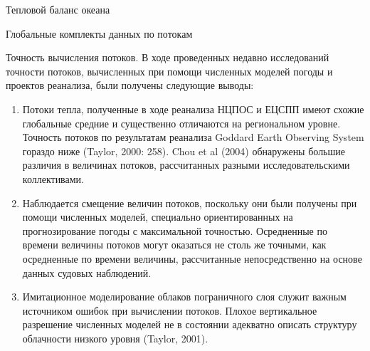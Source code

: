 \begin{chapter}{Тепловой баланс океана}
\begin{section}{Глобальные комплекты данных по потокам}
\begin{paragraph}{Точность вычисления потоков.}
В ходе проведенных недавно исследований точности потоков, вычисленных при
помощи численных моделей погоды и проектов реанализа, были получены следующие
выводы:
%
\begin{enumerate}
\item
Потоки тепла, полученные в ходе реанализа НЦПОС и ЕЦСПП имеют схожие глобальные
средние и существенно отличаются на региональном уровне. Точность потоков по
результатам реанализа Goddard Earth Observing System гораздо 
ниже (Taylor, 2000: 258). Chou et al (2004) обнаружены большие различия в
величинах потоков, рассчитанных разными исследовательскими коллективами.
%

\item
Наблюдается смещение величин потоков, поскольку они были получены при помощи
численных моделей, специально ориентированных на прогнозирование погоды
с максимальной точностью. Осредненные по времени величины потоков могут 
оказаться не столь же точными, как осредненные по времени величины, 
рассчитанные непосредственно на основе данных судовых наблюдений.
%

\item
Имитационное моделирование облаков пограничного слоя служит важным источником
ошибок при вычислении потоков. Плохое вертикальное разрешение численных моделей
не в состоянии адекватно описать структуру облачности низкого уровня (Taylor, 2001).
%


\end{enumerate}
\end{paragraph}
\end{section}
\end{chapter}
